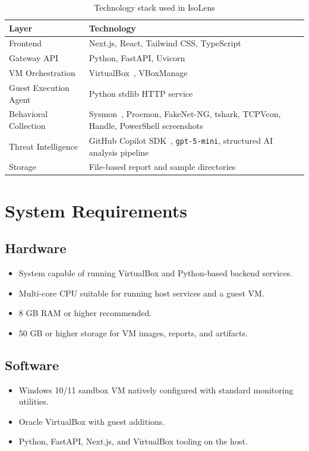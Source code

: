 \documentclass[a4paper,12pt,oneside]{report}
\begin{document}
\begin{table}[H]
\centering
\caption{Technology stack used in IsoLens}
\label{tab:tech_stack}
\begin{tabularx}{\textwidth}{>{\raggedright\arraybackslash}p{4cm}X}
\toprule
\textbf{Layer} & \textbf{Technology} \\
\midrule
Frontend & Next.js, React, Tailwind CSS, TypeScript \\
Gateway API & Python, FastAPI, Uvicorn \\
VM Orchestration & VirtualBox~\cite{vbox}, VBoxManage \\
Guest Execution Agent & Python stdlib HTTP service \\
Behavioral Collection & Sysmon~\cite{sysmon}, Procmon, FakeNet-NG, tshark, TCPVcon, Handle, PowerShell screenshots \\
Threat Intelligence & GitHub Copilot SDK~\cite{copilot}, \texttt{gpt-5-mini}, structured AI analysis pipeline \\
Storage & File-based report and sample directories \\
\bottomrule
\end{tabularx}
\end{table}

\section{System Requirements}
\enlargethispage{2\baselineskip}
\subsection{Hardware}
\begin{itemize}
\item System capable of running VirtualBox and Python-based backend services.
\item Multi-core CPU suitable for running host services and a guest VM.
\item 8 GB RAM or higher recommended.
\item 50 GB or higher storage for VM images, reports, and artifacts.
\end{itemize}

\subsection{Software}
\begin{itemize}
\item Windows 10/11 sandbox VM natively configured with standard monitoring utilities.
\item Oracle VirtualBox with guest additions.
\item Python, FastAPI, Next.js, and VirtualBox tooling on the host.
\end{itemize}
\end{document}
